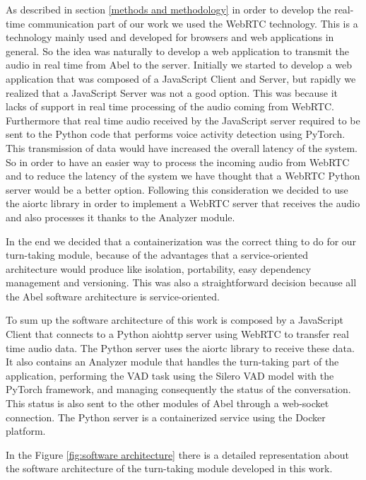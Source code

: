 \documentclass[../main.tex]{subfiles}
\begin{document}
As described in section \ref{methods and methodology} in order to develop the real-time communication part of our work we used the WebRTC technology. This is a technology mainly used and developed for browsers and web applications in general. So the idea was naturally to develop a web application to transmit the audio in real time from Abel to the server. Initially we started to develop a web application that was composed of a JavaScript Client and Server, but rapidly we realized that a JavaScript Server was not a good option. This was because it lacks of support in real time processing of the audio coming from WebRTC. Furthermore that real time audio received by the JavaScript server required to be sent to the Python code that performs voice activity detection using PyTorch. This transmission of data would have increased the overall latency of the system. So in order to have an easier way to process the incoming audio from WebRTC and to reduce the latency of the system we have thought that a WebRTC Python server would be a better option. Following this consideration we decided to use the aiortc library in order to implement a WebRTC server that receives the audio and also processes it thanks to the Analyzer module. 

In the end we decided that a containerization was the correct thing to do for our turn-taking module, because of the advantages that a service-oriented architecture would produce like isolation, portability, easy dependency management and versioning. This was also a straightforward decision because all the Abel software architecture is service-oriented. 

To sum up the software architecture of this work is composed by a JavaScript Client that connects to a Python aiohttp server using WebRTC to transfer real time audio data. The Python server uses the aiortc library to receive these data. It also contains an Analyzer module that handles the turn-taking part of the application, performing the VAD task using the Silero VAD model with the PyTorch framework, and managing consequently the status of the conversation. This status is also sent to the other modules of Abel through a web-socket connection. The Python server is a containerized service using the Docker platform.

In the Figure \ref{fig:software architecture} there is a detailed representation about the software architecture of the turn-taking module developed in this work.
\end{document}
